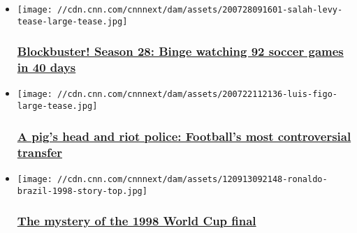 \begin{itemize}
\item
  \href{/2020/07/28/football/premier-league-restart-glen-levy-binge-cmd-spt-intl/index.html}{}

  \texttt{[image: //cdn.cnn.com/cnnnext/dam/assets/200728091601-salah-levy-tease-large-tease.jpg]}

  \hypertarget{blockbuster-season-28-binge-watching-92-soccer-games-in-40-days}{%
  \subsubsection{\texorpdfstring{\href{/2020/07/28/football/premier-league-restart-glen-levy-binge-cmd-spt-intl/index.html}{Blockbuster!
  Season 28: Binge watching 92 soccer games in 40
  days}}{Blockbuster! Season 28: Binge watching 92 soccer games in 40 days}}\label{blockbuster-season-28-binge-watching-92-soccer-games-in-40-days}}
\item
  \href{/2020/07/24/football/luis-figo-barcelona-real-madrid-transfer-spt-intl-cmd/index.html}{}

  \texttt{[image: //cdn.cnn.com/cnnnext/dam/assets/200722112136-luis-figo-large-tease.jpg]}

  \hypertarget{a-pigs-head-and-riot-police-footballs-most-controversial-transfer}{%
  \subsubsection{\texorpdfstring{\href{/2020/07/24/football/luis-figo-barcelona-real-madrid-transfer-spt-intl-cmd/index.html}{A
  pig's head and riot police: Football's most controversial
  transfer}}{A pig's head and riot police: Football's most controversial transfer}}\label{a-pigs-head-and-riot-police-footballs-most-controversial-transfer}}
\item
  \href{/2020/07/12/football/ronaldo-brazil-world-cup-final-1998-cmd-spt-intl/index.html}{}

  \texttt{[image: //cdn.cnn.com/cnnnext/dam/assets/120913092148-ronaldo-brazil-1998-story-top.jpg]}

  \hypertarget{the-mystery-of-the-1998-world-cup-final}{%
  \subsubsection{\texorpdfstring{\href{/2020/07/12/football/ronaldo-brazil-world-cup-final-1998-cmd-spt-intl/index.html}{The
  mystery of the 1998 World Cup
  final}}{The mystery of the 1998 World Cup final}}\label{the-mystery-of-the-1998-world-cup-final}}
\end{itemize}

